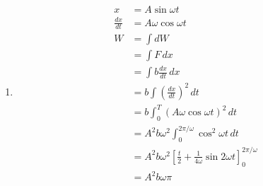 \documentclass{article}
\begin{document}
\begin{enumerate}
  \item

        \begin{align*}
          x               & = A \sin \omega t                                                                                   \\
          \frac{d x}{d t} & = A \omega \cos \omega t                                                                            \\
          W               & = \int dW                                                                                           \\
                          & = \int F \,dx                                                                                       \\
                          & = \int b \frac{d x}{d t} \,dx                                                                       \\
                          & = b \int \left( \frac{d x}{d t} \right)^2 \,dt                                                      \\
                          & = b \int_0^T (A \omega \cos \omega t)^2 \,dt                                                        \\
                          & = A^2 b \omega^2 \int_0^{2 \pi / \omega} \cos^2 \omega t \,dt                                       \\
                          & = A^2 b \omega^2 \left[ \frac{t}{2} + \frac{1}{4 \omega} \sin 2 \omega t \right]_0^{2 \pi / \omega} \\
                          & = A^2 b \omega \pi
        \end{align*}
\end{enumerate}

\setcounter{subsection}{10}
\subsection{}
\end{document}
